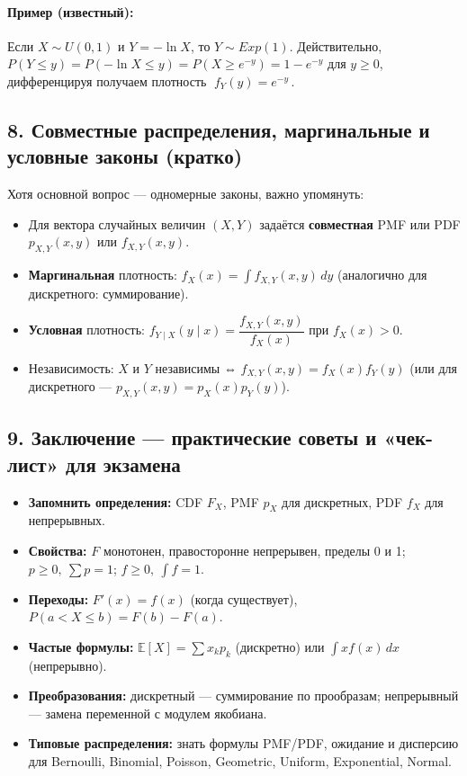 \paragraph{Пример (известный):} Если $X\sim U(0,1)$ и $Y=-\ln X$, то $Y\sim Exp(1)$. Действительно, $P(Y\le y)=P(-\ln X\le y)=P(X\ge e^{-y})=1-e^{-y}$ для $y\ge0$, дифференцируя получаем плотность $\;f_Y(y)=e^{-y}\,$.

\subsection*{8. Совместные распределения, маргинальные и условные законы (кратко)}

Хотя основной вопрос — одномерные законы, важно упомянуть:
\begin{itemize}
  \item Для вектора случайных величин $(X,Y)$ задаётся \textbf{совместная} PMF или PDF $p_{X,Y}(x,y)$ или $f_{X,Y}(x,y)$.
  \item \textbf{Маргинальная} плотность: $f_X(x)=\int f_{X,Y}(x,y)\,dy$ (аналогично для дискретного: суммирование).
  \item \textbf{Условная} плотность: $f_{Y\mid X}(y\mid x)=\dfrac{f_{X,Y}(x,y)}{f_X(x)}$ при $f_X(x)>0$.
  \item Независимость: $X$ и $Y$ независимы ⇔ $f_{X,Y}(x,y)=f_X(x)f_Y(y)$ (или для дискретного — $p_{X,Y}(x,y)=p_X(x)p_Y(y)$).
\end{itemize}

\subsection*{9. Заключение — практические советы и «чек-лист» для экзамена}

\begin{itemize}
  \item \textbf{Запомнить определения:} CDF $F_X$, PMF $p_X$ для дискретных, PDF $f_X$ для непрерывных.
  \item \textbf{Свойства:} $F$ монотонен, правосторонне непрерывен, пределы 0 и 1; $p\ge0,\ \sum p=1$; $f\ge0,\ \int f=1$.
  \item \textbf{Переходы:} $F'(x)=f(x)$ (когда существует), $P(a<X\le b)=F(b)-F(a)$.
  \item \textbf{Частые формулы:} $\mathbb{E}[X]=\sum x_k p_k$ (дискретно) или $\int x f(x)\,dx$ (непрерывно).
  \item \textbf{Преобразования:} дискретный — суммирование по прообразам; непрерывный — замена переменной с модулем якобиана.
  \item \textbf{Типовые распределения:} знать формулы PMF/PDF, ожидание и дисперсию для Bernoulli, Binomial, Poisson, Geometric, Uniform, Exponential, Normal.
\end{itemize}

